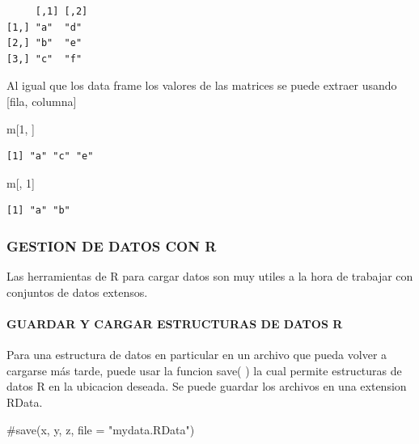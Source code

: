 \documentclass[
  letterpaper,
  DIV=11,
  numbers=noendperiod]{scrartcl}
\let\oldparagraph\paragraph
\renewcommand{\paragraph}[1]{\oldparagraph{#1}\mbox{}}
\newenvironment{Shaded}{\begin{snugshade}}{\end{snugshade}}
\newcommand{\CommentTok}[1]{\textcolor[rgb]{0.37,0.37,0.37}{#1}}
\newcommand{\DecValTok}[1]{\textcolor[rgb]{0.68,0.00,0.00}{#1}}
\newcommand{\NormalTok}[1]{\textcolor[rgb]{0.00,0.23,0.31}{#1}}
\begin{document}
\begin{verbatim}
     [,1] [,2]
[1,] "a"  "d" 
[2,] "b"  "e" 
[3,] "c"  "f" 
\end{verbatim}

Al igual que los data frame los valores de las matrices se puede extraer
usando {[}fila, columna{]}

\begin{Shaded}
\begin{Highlighting}[]
\NormalTok{ m[}\DecValTok{1}\NormalTok{, ]}
\end{Highlighting}
\end{Shaded}

\begin{verbatim}
[1] "a" "c" "e"
\end{verbatim}

\begin{Shaded}
\begin{Highlighting}[]
\NormalTok{ m[, }\DecValTok{1}\NormalTok{]}
\end{Highlighting}
\end{Shaded}

\begin{verbatim}
[1] "a" "b"
\end{verbatim}

\hypertarget{gestion-de-datos-con-r}{%
\subsubsection{GESTION DE DATOS CON R}\label{gestion-de-datos-con-r}}

Las herramientas de R para cargar datos son muy utiles a la hora de
trabajar con conjuntos de datos extensos.

\hypertarget{guardar-y-cargar-estructuras-de-datos-r}{%
\paragraph{GUARDAR Y CARGAR ESTRUCTURAS DE DATOS
R}\label{guardar-y-cargar-estructuras-de-datos-r}}

Para una estructura de datos en particular en un archivo que pueda
volver a cargarse más tarde, puede usar la funcion save( ) la cual
permite estructuras de datos R en la ubicacion deseada. Se puede guardar
los archivos en una extension RData.

\begin{Shaded}
\begin{Highlighting}[]
\CommentTok{\#save(x, y, z, file = "mydata.RData")}
\end{Highlighting}
\end{Shaded}
\end{document}
